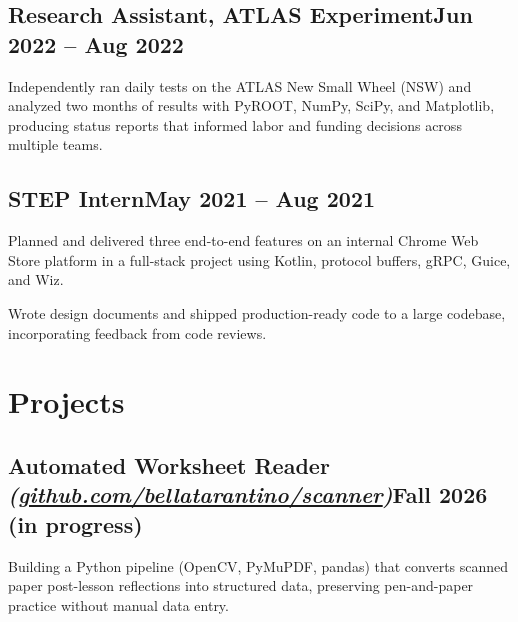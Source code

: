 \documentclass[letter,10pt]{article}
\begin{document}
\vspace*{\entrygap}
\subsection{{Research Assistant, ATLAS Experiment}\hfill Jun 2022 -- Aug 2022}
\begin{zitemize}
\item Independently ran daily tests on the ATLAS New Small Wheel (NSW) and analyzed two months of results with PyROOT, NumPy, SciPy, and Matplotlib, producing status reports that informed labor and funding decisions across multiple teams.
\end{zitemize}

\vspace*{\entrygap}
\subsection{{STEP Intern}\hfill May 2021 -- Aug 2021}
\begin{zitemize}
\item Planned and delivered three end-to-end features on an internal Chrome Web Store platform in a full-stack project using Kotlin, protocol buffers, gRPC, Guice, and Wiz.
\item Wrote design documents and shipped production-ready code to a large codebase, incorporating feedback from code reviews.
\end{zitemize}


\section{Projects}

\subsection{{Automated Worksheet Reader} \textmd{\textit{(\href{https://github.com/bellatarantino/scanner}{github.com/bellatarantino/scanner})}}\hfill Fall 2026 (in progress)}
\begin{zitemize}
\item Building a Python pipeline (OpenCV, PyMuPDF, pandas) that converts scanned paper post-lesson reflections into structured data, preserving pen-and-paper practice without manual data entry.
\end{zitemize}
\end{document}
